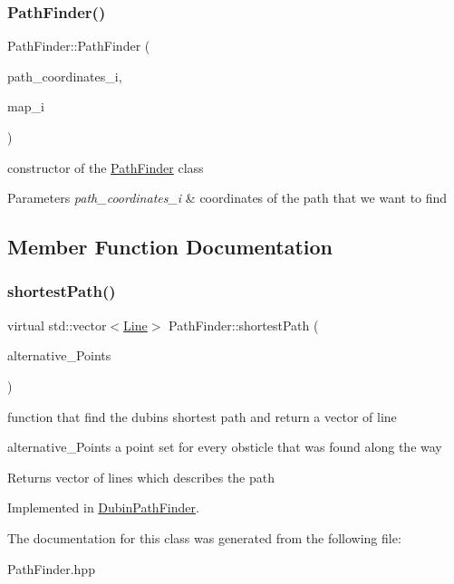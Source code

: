 \subsubsection{\texorpdfstring{Path\+Finder()}{PathFinder()}}
{\footnotesize\ttfamily Path\+Finder\+::\+Path\+Finder (\begin{DoxyParamCaption}\item[{\mbox{\hyperlink{class_path_coordinates}{Path\+Coordinates}}}]{path\+\_\+coordinates\+\_\+i,  }\item[{\mbox{\hyperlink{class_map}{Map}} $\ast$}]{map\+\_\+i }\end{DoxyParamCaption})}



constructor of the \mbox{\hyperlink{class_path_finder}{Path\+Finder}} class 


\begin{DoxyParams}{Parameters}
{\em path\+\_\+coordinates\+\_\+i} & coordinates of the path that we want to find \\
\hline
\end{DoxyParams}


\subsection{Member Function Documentation}
\mbox{\label{class_path_finder_aee7b3017f8f532f9368d2d996d191a10}} 
\subsubsection{\texorpdfstring{shortest\+Path()}{shortestPath()}}
{\footnotesize\ttfamily virtual std\+::vector$<$\mbox{\hyperlink{class_line}{Line}}$>$ Path\+Finder\+::shortest\+Path (\begin{DoxyParamCaption}\item[{std\+::vector$<$ cv\+::\+Point $>$ \&}]{alternative\+\_\+\+Points }\end{DoxyParamCaption})\hspace{0.3cm}{\ttfamily [pure virtual]}}



function that find the dubins shortest path and return a vector of line 

\begin{DoxyItemize}
\item alternative\+\_\+\+Points a point set for every obsticle that was found along the way \begin{DoxyReturn}{Returns}
vector of lines which describes the path 
\end{DoxyReturn}
\end{DoxyItemize}


Implemented in \mbox{\hyperlink{class_dubin_path_finder_adc5d730f6226c4d92202b0ff4126cbb2}{Dubin\+Path\+Finder}}.



The documentation for this class was generated from the following file\+:\begin{DoxyCompactItemize}
\item 
Path\+Finder.\+hpp\end{DoxyCompactItemize}
